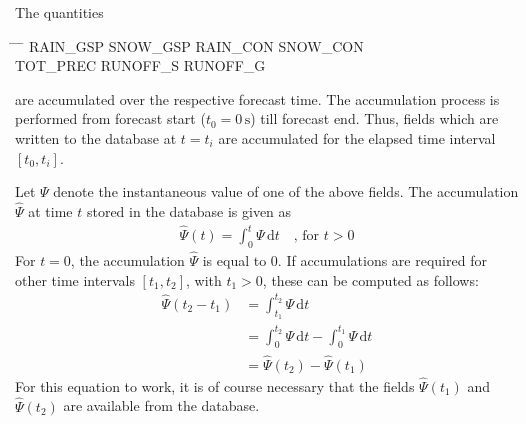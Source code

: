 The quantities
\begin{note}
\begin{tabbing}
  \hspace{0.2\textwidth} \= \hspace{0.2\textwidth} \= \hspace{0.2\textwidth} \= \hspace{0.2\textwidth} \kill
  RAIN\_GSP \>
  SNOW\_GSP \>
  RAIN\_CON \>
  SNOW\_CON \\
  TOT\_PREC  \>
  RUNOFF\_S  \>
  RUNOFF\_G
\end{tabbing}
\end{note}

are accumulated over the respective forecast time. The accumulation process is performed from forecast start  
($t_{0}=0\,\mathrm{s}$) till forecast end. Thus, fields which are written to the database at $t=t_{i}$ 
are accumulated for the elapsed time interval $[t_{0}, t_{i}]$.

Let $\Psi$ denote the instantaneous value of one of the above fields. The accumulation $\hat{\Psi}$ at time $t$ stored in the 
database is given as
\begin{align}
 \hat{\Psi}(t) = \int_{0}^{t} \Psi\, \mathrm{d}t  \quad \text{, for } t>0
\end{align}
For $t=0$, the accumulation $\hat{\Psi}$ is equal to 0. 
If accumulations are required for other time intervals $[t_{1},t_{2}]$, with $t_{1}>0$, these can be computed as follows:
\begin{align}
 \hat{\Psi}(t_{2}-t_{1}) &= \int_{t_{1}}^{t_{2}} \Psi\,\mathrm{d}t \\
                         &= \int_{0}^{t_{2}} \Psi\,\mathrm{d}t  - \int_{0}^{t_{1}} \Psi\,\mathrm{d}t \\
                         &= \hat{\Psi}(t_{2}) - \hat{\Psi}(t_{1})
\end{align}
For this equation to work, it is of course necessary that the fields $\hat{\Psi}(t_{1})$ and $\hat{\Psi}(t_{2})$ are available from the database.

